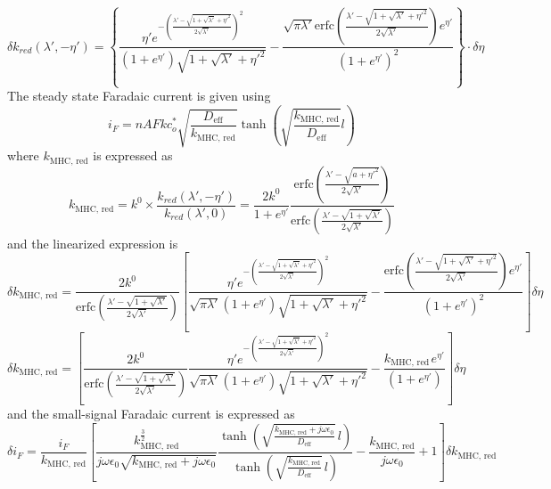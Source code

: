 \documentclass[12pt]{book}
\begin{document}
\begin{equation}
\delta k_{red}\left(\lambda',-\eta'\right)=\left\{ \frac{\eta'e^{-\left(\frac{\lambda'-\sqrt{1+\sqrt{\lambda'}+\eta'^{2}}}{2\sqrt{\lambda'}}\right)^{2}}}{\left(1+e^{\eta'}\right)\sqrt{1+\sqrt{\lambda'}+\eta'^{2}}}-\frac{\sqrt{\pi\lambda'}\textrm{erfc}\left(\frac{\lambda'-\sqrt{1+\sqrt{\lambda'}+\eta'^{2}}}{2\sqrt{\lambda'}}\right)e^{\eta'}}{\left(1+e^{\eta'}\right)^{2}}\right\} \cdot\delta\eta\label{eq:dk_MHC_red_Final}
\end{equation}
The steady state Faradaic current is given using
\begin{equation}
i_{F}=nAFkc_{o}^{*}\sqrt{\frac{D_{\text{eff}}}{k_{\textrm{MHC, red}}}}\tanh\left(\sqrt{\frac{k_{\textrm{MHC, red}}}{D_{\text{eff}}}}l\right)
\end{equation}
where $k_{\textrm{MHC, red}}$ is expressed as
\begin{equation}
k_{\textrm{MHC, red}}=k^{0}\times\frac{k_{red}\left(\lambda',-\eta'\right)}{k_{red}\left(\lambda',0\right)}=\frac{2k^{0}}{1+e^{\eta'}}\frac{\textrm{erfc}\left(\frac{\lambda'-\sqrt{a+\eta'^{2}}}{2\sqrt{\lambda'}}\right)}{\textrm{erfc}\left(\frac{\lambda'-\sqrt{1+\sqrt{\lambda'}}}{2\sqrt{\lambda'}}\right)}
\end{equation}
and the linearized expression is 
\begin{equation}
\delta k_{\textrm{MHC, red}}=\frac{2k^{0}}{\textrm{erfc}\left(\frac{\lambda'-\sqrt{1+\sqrt{\lambda'}}}{2\sqrt{\lambda'}}\right)}\left[\frac{\eta'e^{-\left(\frac{\lambda'-\sqrt{1+\sqrt{\lambda'}+\eta'^{2}}}{2\sqrt{\lambda'}}\right)^{2}}}{\sqrt{\pi\lambda'}\left(1+e^{\eta'}\right)\sqrt{1+\sqrt{\lambda'}+\eta'^{2}}}-\frac{\textrm{erfc}\left(\frac{\lambda'-\sqrt{1+\sqrt{\lambda'}+\eta'^{2}}}{2\sqrt{\lambda'}}\right)e^{\eta'}}{\left(1+e^{\eta'}\right)^{2}}\right]\delta\eta
\end{equation}
\begin{equation}
\delta k_{\textrm{MHC, red}}=\left[\frac{2k^{0}}{\textrm{erfc}\left(\frac{\lambda'-\sqrt{1+\sqrt{\lambda'}}}{2\sqrt{\lambda'}}\right)}\frac{\eta'e^{-\left(\frac{\lambda'-\sqrt{1+\sqrt{\lambda'}+\eta'^{2}}}{2\sqrt{\lambda'}}\right)^{2}}}{\sqrt{\pi\lambda'}\left(1+e^{\eta'}\right)\sqrt{1+\sqrt{\lambda'}+\eta'^{2}}}-\frac{k_{\textrm{MHC, red}\,}e^{\eta'}}{\left(1+e^{\eta'}\right)}\right]\delta\eta
\end{equation}
and the small-signal Faradaic current is expressed as
\begin{equation}
\delta i_{F}=\frac{i_{F}}{k_{\textrm{MHC, red}}}\left[\frac{k_{\textrm{MHC, red}}^{\frac{3}{2}}}{j\omega\epsilon_{0}\sqrt{k_{\textrm{MHC, red}}+j\omega\epsilon_{0}}}\frac{\tanh\left(\sqrt{\frac{k_{\textrm{MHC, red}}+j\omega\epsilon_{0}}{D_{\text{eff}}}}\,l\right)}{\tanh\left(\sqrt{\frac{k_{\textrm{MHC, red}}}{D_{\text{eff}}}}\,l\right)}-\frac{k_{\textrm{MHC, red}}}{j\omega\epsilon_{0}}+1\right]\delta k_{\textrm{MHC, red}}\label{eq:delta_i_MHC_red_Final}
\end{equation}
\end{document}
